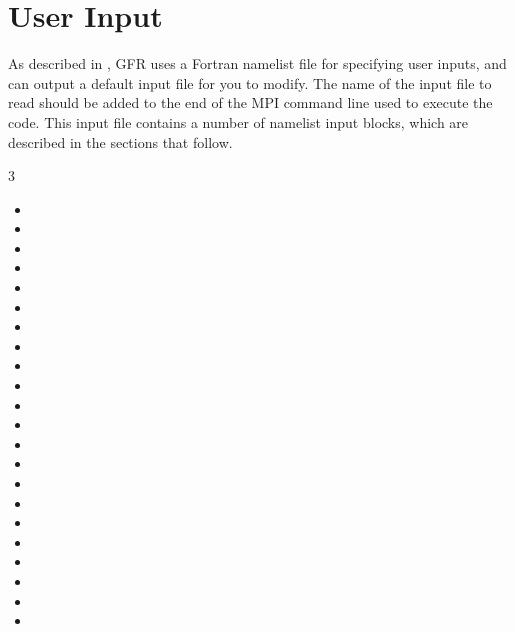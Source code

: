 \section{User Input}
\label{SEC:User_Input}

As described in ,
GFR uses a Fortran namelist file for specifying user inputs,
and can output a default input file for you to modify.
%
The name of the input file to read should be added to the end of the MPI
command line used to execute the code.
%
This input file contains a number of namelist input blocks,
which are described in the sections that follow.
%
\begin{multicols}{3}
\raggedcolumns %
\begin{itemize}
  \item {}
  \item {}
  \item {}
  \item {}
  \item {}
  \item {}
  \item {}
  \item {}
  \item {}
  \item {}
  \item {}
  \item {}
  \item {}
  \item {}
  \item {}
  \item {}
  \item {}
  \item {}
  \item {}
  \item {}
  \item {}
  \item {}
\end{itemize}
\end{multicols}

